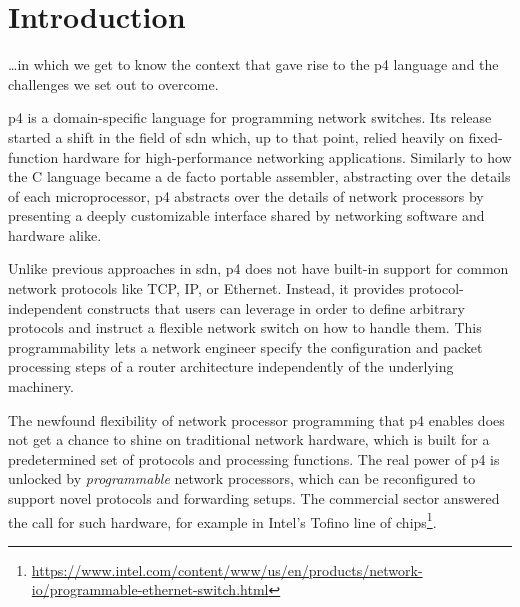 \chapter*{Introduction}

\begin{chapterabstract}
	\dots in which we get to know the context that gave rise to the
	\acrshort{p4} language and the challenges we set out to overcome.
\end{chapterabstract}

\acrfull{p4} is a domain-specific language for programming network switches. Its
release started a shift in the field of \acrfull{sdn} which, up to that point,
relied heavily on fixed-function hardware for high-performance networking
applications. Similarly to how the C language became a de facto portable
assembler, abstracting over the details of each microprocessor, \acrshort{p4}
abstracts over the details of network processors by presenting a deeply
customizable interface shared by networking software and hardware alike.

Unlike previous approaches in \acrshort{sdn}, \acrshort{p4} does not have
built-in support for common network protocols like TCP, IP, or Ethernet.
Instead, it provides protocol-independent constructs that users can leverage in
order to define arbitrary protocols and instruct a flexible network switch on
how to handle them. This programmability lets a network engineer specify the
configuration and packet processing steps of a router architecture independently
of the underlying machinery.

The newfound flexibility of network processor programming that \acrshort{p4}
enables does not get a chance to shine on traditional network hardware, which is
built for a predetermined set of protocols and processing functions. The real
power of \acrshort{p4} is unlocked by \emph{programmable} network processors,
which can be reconfigured to support novel protocols and forwarding setups. The
commercial sector answered the call for such hardware, for example in Intel's
Tofino line of
chips\footnote{\url{https://www.intel.com/content/www/us/en/products/network-io/programmable-ethernet-switch.html}}.


